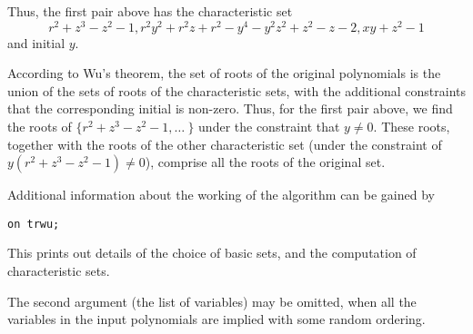 Thus, the first pair above has the characteristic set
$$ r^2 + z^3 - z^2 - 1,
r^2 y^2 + r^2 z + r^2 - y^4 - y^2 z^2 + z^2 - z - 2,
x y + z^2 - 1$$
and initial $y$.

According to Wu's theorem, the set of roots of the original polynomials
is the union of the sets of roots of the characteristic sets,
with the additional constraints that the
corresponding initial is non-zero. Thus, for the first pair above, we find the
roots of $\{ r^2 + z^3 - z^2 - 1, \ldots~\}$ under the constraint that
$y \neq 0$. These roots, together with the roots of the other
characteristic set (under the constraint of $y(r^2+z^3-z^2-1) \neq 0$),
comprise all the roots of the original set.

Additional information about the working of the algorithm can be gained by
\begin{verbatim}
on trwu;
\end{verbatim}
This prints out details of the choice of basic sets, and the computation
of characteristic sets.

The second argument (the list of variables) may be omitted, when all the
variables in the input polynomials are implied with some random ordering.
